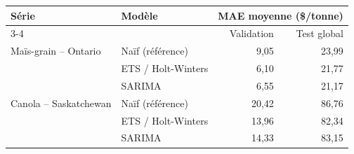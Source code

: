 \begin{tabular}{llrr}
\toprule
Série & Modèle & \multicolumn{2}{c}{MAE moyenne (\$/tonne)} \\
\cmidrule(lr){3-4}
& & Validation & Test global \\
\midrule
Maïs-grain -- Ontario & Naïf (référence) & 9,05 & 23,99 \\
 & ETS / Holt-Winters & 6,10 & 21,77 \\
 & SARIMA & 6,55 & 21,17 \\
\midrule
Canola -- Saskatchewan & Naïf (référence) & 20,42 & 86,76 \\
 & ETS / Holt-Winters & 13,96 & 82,34 \\
 & SARIMA & 14,33 & 83,15 \\
\bottomrule
\end{tabular}
